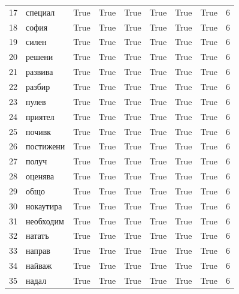 \begin{longtable}{rlllllllr}
  17 &     специал &     True &   True &   True &       True &           True &      True &      6 \\
  18 &       софия &     True &   True &   True &       True &           True &      True &      6 \\
  19 &       силен &     True &   True &   True &       True &           True &      True &      6 \\
  20 &      решени &     True &   True &   True &       True &           True &      True &      6 \\
  21 &     развива &     True &   True &   True &       True &           True &      True &      6 \\
  22 &      разбир &     True &   True &   True &       True &           True &      True &      6 \\
  23 &       пулев &     True &   True &   True &       True &           True &      True &      6 \\
  24 &     приятел &     True &   True &   True &       True &           True &      True &      6 \\
  25 &      почивк &     True &   True &   True &       True &           True &      True &      6 \\
  26 &   постижени &     True &   True &   True &       True &           True &      True &      6 \\
  27 &       получ &     True &   True &   True &       True &           True &      True &      6 \\
  28 &     оценява &     True &   True &   True &       True &           True &      True &      6 \\
  29 &        общо &     True &   True &   True &       True &           True &      True &      6 \\
  30 &   нокаутира &     True &   True &   True &       True &           True &      True &      6 \\
  31 &   необходим &     True &   True &   True &       True &           True &      True &      6 \\
  32 &      нататъ &     True &   True &   True &       True &           True &      True &      6 \\
  33 &      направ &     True &   True &   True &       True &           True &      True &      6 \\
  34 &      найваж &     True &   True &   True &       True &           True &      True &      6 \\
  35 &       надал &     True &   True &   True &       True &           True &      True &      6 \\

\end{longtable}
